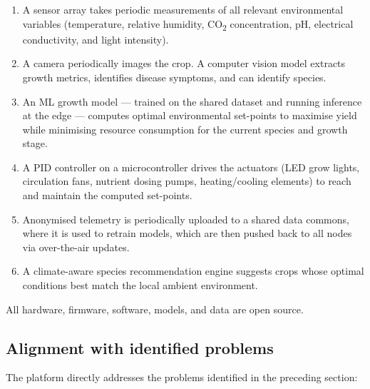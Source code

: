 \begin{enumerate}
  \item A sensor array takes periodic measurements of all relevant environmental variables (temperature, relative humidity, CO\textsubscript{2} concentration, pH, electrical conductivity, and light intensity).
  \item A camera periodically images the crop. A computer vision model extracts growth metrics, identifies disease symptoms, and can identify species.
  \item An ML growth model --- trained on the shared dataset and running inference at the edge --- computes optimal environmental set-points to maximise yield while minimising resource consumption for the current species and growth stage.
  \item A PID controller on a microcontroller drives the actuators (LED grow lights, circulation fans, nutrient dosing pumps, heating/cooling elements) to reach and maintain the computed set-points.
  \item Anonymised telemetry is periodically uploaded to a shared data commons, where it is used to retrain models, which are then pushed back to all nodes via over-the-air updates.
  \item A climate-aware species recommendation engine suggests crops whose optimal conditions best match the local ambient environment.
\end{enumerate}

All hardware, firmware, software, models, and data are open source.

\subsection{Alignment with identified problems}

The platform directly addresses the problems identified in the preceding section:

